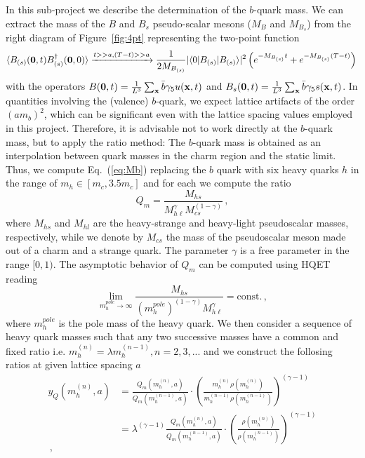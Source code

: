 In this sub-project we describe the determination of the $b$-quark
mass. We can extract the mass of the $B$ and $B_s$ pseudo-scalar mesons ($M_{B}$ and $M_{B_s}$)
from the right diagram of Figure~\ref{fig:4pt} representing the two-point function
\begin{equation}
  \langle B_{(s)}(\bm{0},t) B_{(s)}^\dagger({\bf 0},0)\rangle\xrightarrow{t>>a, (T-t)>>a}
  \frac{1}{2M_{B_{(s)}}}|\langle 0 | B_{(s)} | B_{(s)}\rangle|^2\left(e^{-M_{B_{(s)}} t}+e^{-M_{B_{(s)}}(T-t)}\right)
  \,
  \label{eq:Mb}
\end{equation}
with the operators $B({\bf 0},t)=\frac{1}{L^3}\sum_{\bf x}\bar b\gamma_5 u({\bf x},t)$
and $B_s({\bf 0},t)=\frac{1}{L^3}\sum_{\bf x}\bar b\gamma_5 s({\bf
  x},t)$.
In quantities involving the (valence) $b$-quark, we expect lattice
artifacts of the order $(am_b)^2$, which can be significant even with
the lattice spacing values employed in this project. Therefore, it is
advisable not to work directly at the $b$-quark mass, but to apply the
ratio method: The $b$-quark mass is obtained as an interpolation
between quark masses in the charm region and the static limit.
Thus, we compute Eq.~(\ref{eq:Mb}) replacing the $b$ quark with six heavy quarks $h$
in the range of $m_h\in [m_c,3.5m_c]$
and for each we compute the ratio
\begin{equation}
  Q_m = \frac{M_{hs}}{M_{h\ell}^\gamma M_{cs}^{(1-\gamma)}}\,,
  \label{eq:ratio_Q}
\end{equation}
where $M_{hs}$ and $M_{hl}$ are the heavy-strange and heavy-light
pseudoscalar masses, respectively, while we denote by $M_{cs}$
the mass of the pseudoscalar meson made out of a charm
and a strange quark. The parameter $\gamma$ is a free parameter in the range $[0, 1)$.
The asymptotic behavior of $Q_m$ can be computed using HQET reading
\begin{equation}
  \lim_{ m^{pole}_h\to \infty}
  \frac{M_{hs}}{( m^{pole}_h)^{(1-\gamma)} M_{h\ell}^\gamma}=\mbox{const.}\,,
  \label{eq:yHQFTlim}
\end{equation}
where $ m^{pole}_h$ is the pole mass of the heavy quark.
We then consider a sequence of heavy quark masses such that any two
successive masses have a common and fixed ratio i.e.
$ m_h^{(n)}=\lambda m_h^{(n-1)}, n=2,3,...$ and we construct the
follosing ratios at given lattice spacing $a$
\begin{equation}
  \begin{split}
    y_Q( m^{(n)}_h,a)&=\frac{Q_m( m_h^{(n)},a)}{Q_m( m_h^{(n-1)},a)}\cdot
    \left(\frac{ m_{h}^{(n)} \rho( m_{h}^{(n)})}{ m_{h}^{(n-1)}\rho( m_{h}^{(n-1)})}\right)^{(\gamma-1)}\\
    &=\lambda^{(\gamma-1)}\frac{Q_m( m_h^{(n)},a)}{Q_m( m_h^{(n-1)},a)}\cdot
    \left(\frac{ \rho( m_{h}^{(n)})}{\rho(
      m_{h}^{(n-1)})}\right)^{(\gamma-1)}\\\,,
  \end{split}
\end{equation}
